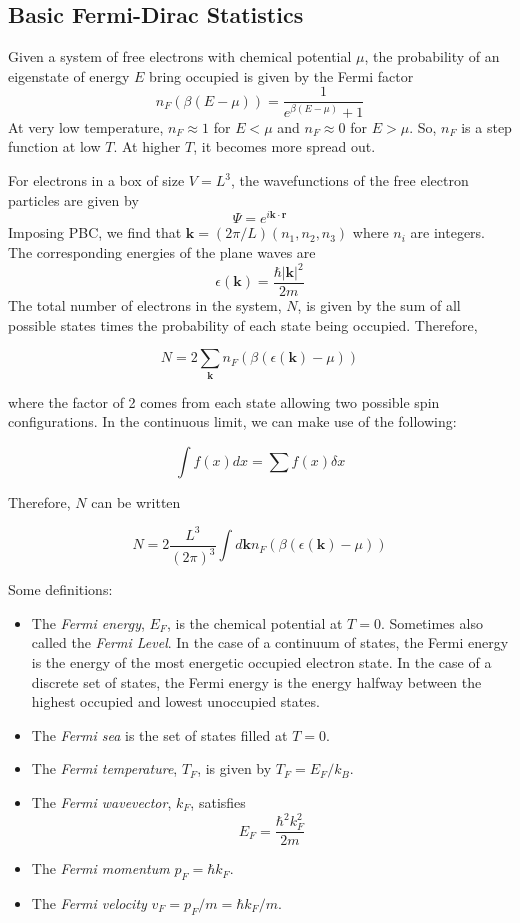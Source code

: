 \documentclass[10pt]{article}
\begin{document}
\subsection{Basic Fermi-Dirac Statistics}
Given a system of free electrons with chemical potential $\mu$, the probability of an eigenstate of energy $E$ bring occupied is given by the
Fermi factor
$$n_{F}(\beta(E-\mu)) = \frac{1}{e^{\beta(E - \mu)}+1}$$
At very low temperature, $n_{F} \approx 1$ for $E < \mu$ and $n_{F} \approx 0$ for $E > \mu$. So, $n_{F}$ is a step function
at low $T$. At higher $T$, it becomes more spread out.

For electrons in a box of size $V = L^{3}$, the wavefunctions of the free electron particles are given by
$$\Psi = e^{i\textbf{k}\cdot\textbf{r}}$$
Imposing PBC, we find that $\textbf{k} = (2\pi/L)(n_{1},n_{2},n_{3})$ where $n_{i}$ are integers. The corresponding
energies of the plane waves are
$$\epsilon(\textbf{k}) = \frac{\hbar |\textbf{k}|^{2}}{2m}$$
The total number of electrons in the system, $N$, is given by the sum of all possible states times the probability of each state being occupied.
Therefore,

$$N = 2 \sum_{\textbf{k}}n_{F}(\beta(\epsilon(\textbf{k}) - \mu))$$

where the factor of 2 comes from each state allowing two possible spin configurations. In the continuous limit, we can make
use of the following:

$$\int f(x)dx = \sum f(x)\delta x$$

Therefore, $N$ can be written

$$
N = 2 \frac{L^{3}}{(2\pi)^{3}}\int d\textbf{k} n_{F}(\beta(\epsilon(\textbf{k}) - \mu))
$$

Some definitions:
\begin{itemize}
  \item The \emph{Fermi energy}, $E_{F}$, is the chemical potential at $T = 0$. Sometimes also called the \emph{Fermi Level}.
  In the case of a continuum of states, the Fermi energy is the energy of the most energetic occupied electron state. In the case of a discrete
  set of states, the Fermi energy is the energy halfway between the highest occupied and lowest unoccupied states.
  \item The \emph{Fermi sea} is the set of states filled at $T = 0$.
  \item The \emph{Fermi temperature}, $T_{F}$, is given by $T_{F} = E_{F}/k_{B}$.
  \item The \emph{Fermi wavevector}, $k_{F}$, satisfies
  $$E_{F} = \frac{\hbar^{2}k_{F}^{2}}{2m}$$
  \item The \emph{Fermi momentum} $p_{F} = \hbar k_{F}$.
  \item The \emph{Fermi velocity} $v_{F} = p_{F}/m = \hbar k_{F}/m$.
\end{itemize}
\end{document}
